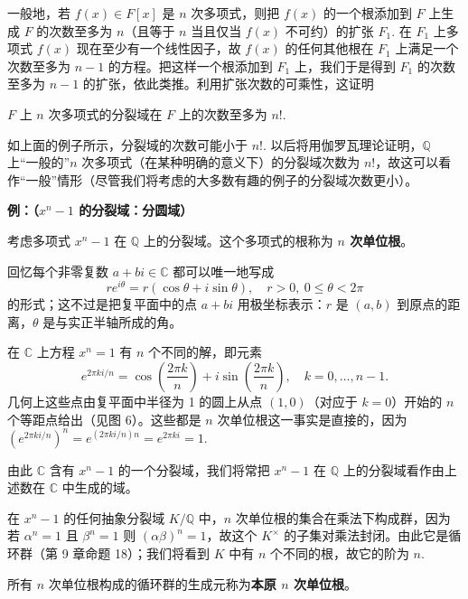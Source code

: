 一般地，若 \(f(x) \in F[x]\) 是 \(n\) 次多项式，则把 \(f(x)\) 的一个根添加到 \(F\) 上生成 \(F\) 的次数至多为 \(n\)（且等于 \(n\) 当且仅当 \(f(x)\) 不可约）的扩张 \(F_1\). 在 \(F_1\) 上多项式 \(f(x)\) 现在至少有一个线性因子，故 \(f(x)\) 的任何其他根在 \(F_1\) 上满足一个次数至多为 \(n-1\) 的方程。把这样一个根添加到 \(F_1\) 上，我们于是得到 \(F_1\) 的次数至多为 \(n-1\) 的扩张，依此类推。利用扩张次数的可乘性，这证明

\begin{proposition}\label{pro:13.26}
\(F\) 上 \(n\) 次多项式的分裂域在 \(F\) 上的次数至多为 \(n!\).
\end{proposition}

如上面的例子所示，分裂域的次数可能小于 \(n!\). 以后将用伽罗瓦理论证明，\(\mathbb{Q}\) 上“一般的”\(n\) 次多项式（在某种明确的意义下）的分裂域次数为 \(n!\)，故这可以看作“一般”情形（尽管我们将考虑的大多数有趣的例子的分裂域次数更小）。

\noindent\textbf{例：（\(x^n-1\) 的分裂域：分圆域）}

考虑多项式 \(x^n-1\) 在 \(\mathbb{Q}\) 上的分裂域。这个多项式的根称为 \textbf{\(n\) 次单位根}。

回忆每个非零复数 \(a+bi \in \mathbb{C}\) 都可以唯一地写成
\[
re^{i\theta} = r(\cos\theta+i\sin\theta), \quad r > 0,\ 0 \leq \theta < 2\pi
\]
的形式；这不过是把复平面中的点 \(a+bi\) 用极坐标表示：\(r\) 是 \((a, b)\) 到原点的距离，\(\theta\) 是与实正半轴所成的角。

在 \(\mathbb{C}\) 上方程 \(x^n = 1\) 有 \(n\) 个不同的解，即元素
\[
e^{2\pi ki/n} = \cos\left(\frac{2\pi k}{n}\right)+i\sin\left(\frac{2\pi k}{n}\right), \quad k = 0, \ldots, n-1.
\]
几何上这些点由复平面中半径为 1 的圆上从点 \((1, 0)\)（对应于 \(k = 0\)）开始的 \(n\) 个等距点给出（见图 6）。这些都是 \(n\) 次单位根这一事实是直接的，因为 \((e^{2\pi ki/n})^n = e^{(2\pi ki/n)n} = e^{2\pi ki} = 1\).

由此 \(\mathbb{C}\) 含有 \(x^n-1\) 的一个分裂域，我们将常把 \(x^n-1\) 在 \(\mathbb{Q}\) 上的分裂域看作由上述数在 \(\mathbb{C}\) 中生成的域。

在 \(x^n-1\) 的任何抽象分裂域 \(K/\mathbb{Q}\) 中，\(n\) 次单位根的集合在乘法下构成群，因为若 \(\alpha^n = 1\) 且 \(\beta^n = 1\) 则 \((\alpha\beta)^n = 1\)，故这个 \(K^\times\) 的子集对乘法封闭。由此它是循环群（第 9 章命题 18）；我们将看到 \(K\) 中有 \(n\) 个不同的根，故它的阶为 \(n\).

\begin{definition}
所有 \(n\) 次单位根构成的循环群的生成元称为\textbf{本原 \(n\) 次单位根}。
\end{definition}


